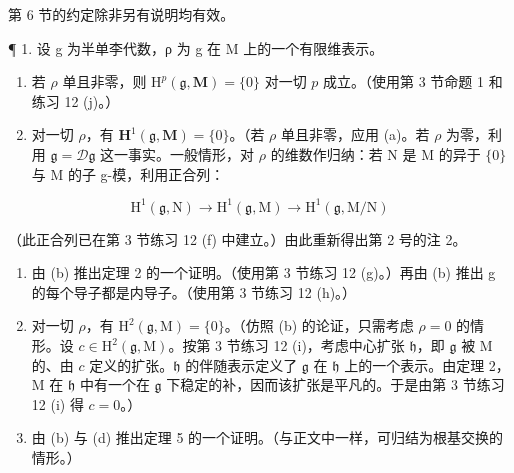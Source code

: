 
第 6 节的约定除非另有说明均有效。

¶ 1. 设 g 为半单李代数，ρ 为 g 在 M 上的一个有限维表示。

\begin{enumerate}
\def\labelenumi{(\alph{enumi})}
\item
  若 \(\rho\) 单且非零，则 \(\mathrm{H}^p (\mathfrak{g},\mathbf{M}) = \{0\}\) 对一切 \(p\) 成立。（使用第 3 节命题 1 和练习 12 (j)。）
\item
  对一切 \(\rho\)，有 \(\mathbf{H}^1(\mathfrak{g}, \mathbf{M}) = \{0\}\)。（若 \(\rho\) 单且非零，应用 (a)。若 \(\rho\) 为零，利用 \(\mathfrak{g} = \mathcal{D}\mathfrak{g}\) 这一事实。一般情形，对 \(\rho\) 的维数作归纳：若 N 是 M 的异于 \(\{0\}\) 与 M 的子 g-模，利用正合列：
\end{enumerate}

\[
\mathrm{H} ^ {1} (\mathfrak {g}, \mathrm{N}) \rightarrow \mathrm{H} ^ {1} (\mathfrak {g}, \mathrm{M}) \rightarrow \mathrm{H} ^ {1} (\mathfrak {g}, \mathrm{M} / \mathrm{N})
\]

（此正合列已在第 3 节练习 12 (f) 中建立。）由此重新得出第 2 号的注 2。

\begin{enumerate}
\def\labelenumi{(\alph{enumi})}
\setcounter{enumi}{2}
\item
  由 (b) 推出定理 2 的一个证明。（使用第 3 节练习 12 (g)。）再由 (b) 推出 g 的每个导子都是内导子。（使用第 3 节练习 12 (h)。）
\item
  对一切 \(\rho\)，有 \(\mathrm{H}^2(\mathfrak{g}, \mathrm{M}) = \{0\}\)。（仿照 (b) 的论证，只需考虑 \(\rho = 0\) 的情形。设 \(c \in \mathrm{H}^2(\mathfrak{g}, \mathrm{M})\)。按第 3 节练习 12 (i)，考虑中心扩张 \(\mathfrak{h}\)，即 \(\mathfrak{g}\) 被 \(\mathrm{M}\) 的、由 \(c\) 定义的扩张。\(\mathfrak{h}\) 的伴随表示定义了 \(\mathfrak{g}\) 在 \(\mathfrak{h}\) 上的一个表示。由定理 2，\(\mathrm{M}\) 在 \(\mathfrak{h}\) 中有一个在 \(\mathfrak{g}\) 下稳定的补，因而该扩张是平凡的。于是由第 3 节练习 12 (i) 得 \(c = 0\)。）
\item
  由 (b) 与 (d) 推出定理 5 的一个证明。（与正文中一样，可归结为根基交换的情形。）
\end{enumerate}

